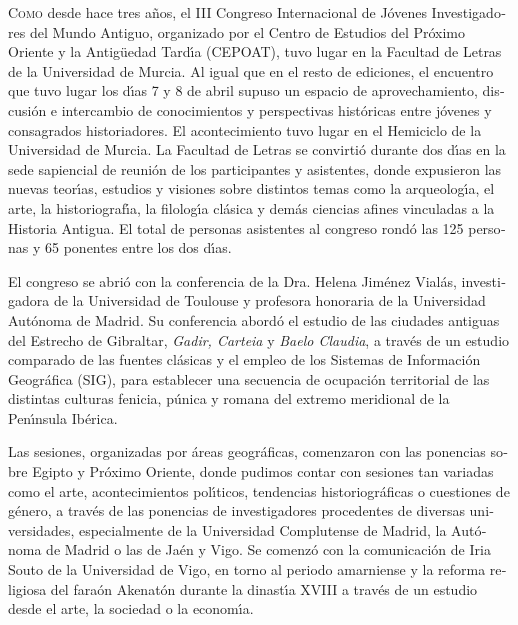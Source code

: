 \documentclass[spanish]{ijsra}
\begin{document}
\begin{otherlanguage}{spanish}
\IJSRAopening
\lettrine{C}{omo} desde hace tres a\~{n}os, el III Congreso Internacional de J\'{o}venes Investigadores del Mundo Antiguo, organizado por el Centro de Estudios del Pr\'{o}ximo Oriente y la Antig\"{u}edad Tard\'{\i}a (CEPOAT), tuvo lugar en la Facultad de Letras de la Universidad de Murcia. Al igual que en el resto de ediciones, el encuentro que tuvo lugar los d\'{\i}as 7 y 8 de abril supuso un espacio de aprovechamiento, discusi\'{o}n e intercambio de conocimientos y perspectivas hist\'{o}ricas entre j\'{o}venes y consagrados historiadores. El acontecimiento tuvo lugar en el Hemiciclo de la Universidad de Murcia. La Facultad de Letras se convirti\'{o} durante dos d\'{\i}as en la sede sapiencial de reuni\'{o}n de los participantes y asistentes, donde expusieron las nuevas teor\'{\i}as, estudios y visiones sobre distintos temas como la arqueolog\'{\i}a, el arte, la historiograf\'{\i}a, la filolog\'{\i}a cl\'{a}sica y dem\'{a}s ciencias afines vinculadas a la Historia Antigua. El total de personas asistentes al congreso rond\'{o} las 125 personas y 65 ponentes entre los dos d\'{\i}as.

El congreso se abri\'{o} con la conferencia de la Dra. Helena Jim\'{e}nez Vial\'{a}s, investigadora de la Universidad de Toulouse y profesora honoraria de la Universidad Aut\'{o}noma de Madrid. Su conferencia abord\'{o} el estudio de las ciudades antiguas del Estrecho de Gibraltar, \textit{Gadir, Carteia} y \textit{Baelo Claudia}, a trav\'{e}s de un estudio comparado de las fuentes cl\'{a}sicas y el empleo de los Sistemas de Informaci\'{o}n Geogr\'{a}fica (SIG), para establecer una secuencia de ocupaci\'{o}n territorial de las distintas culturas fenicia, p\'{u}nica y romana del extremo meridional de la Pen\'{\i}nsula Ib\'{e}rica. 

Las sesiones, organizadas por \'{a}reas geogr\'{a}ficas, comenzaron con las ponencias sobre Egipto y Pr\'{o}ximo Oriente, donde pudimos contar con sesiones tan variadas como el arte, acontecimientos pol\'{\i}ticos, tendencias historiogr\'{a}ficas o cuestiones de g\'{e}nero, a trav\'{e}s de las ponencias de investigadores procedentes de diversas universidades, especialmente de la Universidad Complutense de Madrid, la Aut\'{o}noma de Madrid o las de Ja\'{e}n y Vigo. Se comenz\'{o} con la comunicaci\'{o}n de Iria Souto de la Universidad de Vigo, en torno al periodo amarniense y la reforma religiosa del fara\'{o}n Akenat\'{o}n durante la dinast\'{\i}a XVIII a trav\'{e}s de un estudio desde el arte, la sociedad o la econom\'{\i}a.


\end{otherlanguage}
\end{document}
